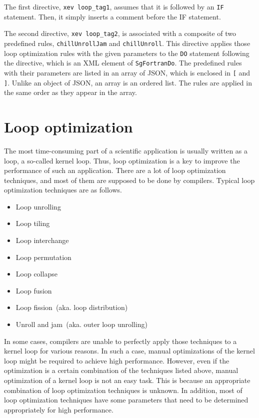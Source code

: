 The first directive, \texttt{xev loop\_tag1}, assumes that it is
followed by an \texttt{IF} statement. Then, it simply inserts a comment
before the IF statement.

The second directive, \texttt{xev loop\_tag2}, is associated with a
composite of two predefined rules, \texttt{chillUnrollJam} and
\texttt{chillUnroll}.  This directive applies those loop optimization
rules with the given parameters to the \texttt{DO} statement following
the directive, which is an XML element of \texttt{SgFortranDo}.  The
predefined rules with their parameters are listed in an array of JSON,
which is enclosed in \texttt{[} and \texttt{]}. Unlike an object of
JSON, an array is an ordered list. The rules are applied in the same
order as they appear in the array.

\section{Loop optimization}
The most time-consuming part of a scientific application is usually
written as a loop, a so-called kernel loop.  Thus, loop optimization is
a key to improve the performance of such an application.  There are a
lot of loop optimization techniques, and most of them are supposed to be
done by compilers. Typical loop optimization techniques are as follows.
\begin{itemize}
 \item Loop unrolling
 \item Loop tiling
 \item Loop interchange
 \item Loop permutation
 \item Loop collapse
 \item Loop fusion
 \item Loop fission~(aka. loop distribution)
 \item Unroll and jam~(aka. outer loop unrolling)
\end{itemize}

In some cases, compilers are unable to perfectly apply those techniques
to a kernel loop for various reasons.  In such a case, manual
optimizations of the kernel loop might be required to achieve high
performance. However, even if the optimization is a certain combination
of the techniques listed above, manual optimization of a kernel loop is
not an easy task. This is because an appropriate combination of loop
optimization techniques is unknown. In addition, most of loop
optimization techniques have some parameters that need to be determined
appropriately for high performance.

